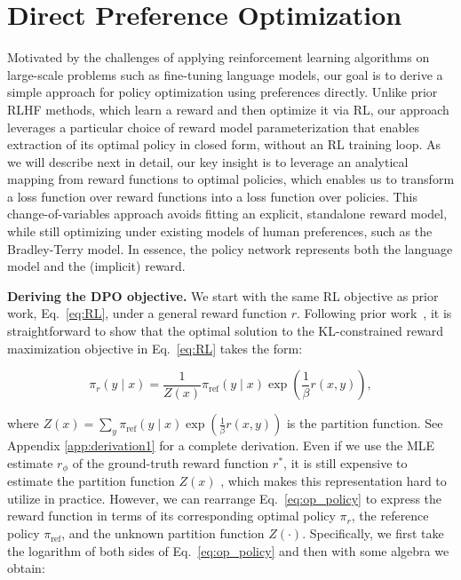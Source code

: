 \section{Direct Preference Optimization}\label{sec:DPO}

Motivated by the challenges of applying reinforcement learning algorithms on large-scale problems such as fine-tuning language models, our goal is to derive a simple approach for policy optimization using preferences directly. Unlike prior RLHF methods, which learn a reward and then optimize it via RL, our approach leverages a particular choice of reward model parameterization that enables extraction of its optimal policy in closed form, without an RL training loop. As we will describe next in detail, our key insight is to leverage an analytical mapping from reward functions to optimal policies, which enables us to transform a loss function over reward functions into a loss function over policies. This change-of-variables approach avoids fitting an explicit, standalone reward model, while still optimizing under existing models of human preferences, such as the Bradley-Terry model. In essence, the policy network represents both the language model and the (implicit) reward.

\textbf{Deriving the DPO objective.} We start with the same RL objective as prior work, Eq.~\ref{eq:RL}, under a general reward function $r$. Following prior work~\citep{peters2007reinforcement, peng2019advantage, korbak2022reinforcement, go2023aligning}, it is straightforward to show that the optimal solution to the KL-constrained reward maximization objective in Eq.~\ref{eq:RL} takes the form:

\begin{equation}\label{eq:op_policy}
    \pi_r(y\mid x) = \frac{1}{Z(x)}\pi_\text{ref}(y\mid x)\exp\left(\frac{1}{\beta}r(x, y)\right),
\end{equation}

where $Z(x) =\sum_{y}\pi_\text{ref}(y\mid x)\exp\left(\frac{1}{\beta}r(x, y)\right)$ is the partition function. See Appendix \ref{app:derivation1} for a complete derivation. Even if we use the MLE estimate $r_{\phi}$ of the ground-truth reward function $r^*$, it is still expensive to estimate the partition function $Z(x)$ \citep{korbak2022reinforcement, go2023aligning}, which makes this representation hard to utilize in practice. However, we can rearrange Eq.~\ref{eq:op_policy} to express the reward function in terms of its corresponding optimal policy $\pi_r$, the reference policy $\pi_\text{ref}$, and the unknown partition function $Z(\cdot)$. Specifically, we first take the logarithm of both sides of Eq.~\ref{eq:op_policy} and then with some algebra we obtain:

